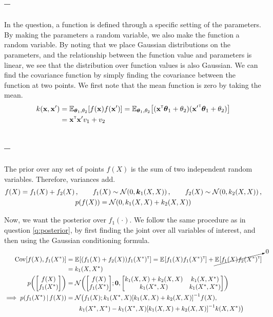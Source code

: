 \documentclass[a4paper]{article}
\newcommand{\mat}[1]{{\boldsymbol{{#1}}}} %
\newcommand{\questionref}[1]{\Cref{#1} -- \nameref{#1}}
\theoremstyle{definition}
\begin{document}
\subsection{\questionref{q:weights}}
In the question, a function is defined through a specific setting of the parameters. By making the parameters a random variable, we also make the function a random variable. By noting that we place Gaussian distributions on the parameters, and the relationship between the function value and parameters is linear, we see that the distribution over function values is also Gaussian. We can find the covariance function by simply finding the covariance between the function at two points. We first note that the mean function is zero by taking the mean.
\begin{align}
k(\vx, \vx') &= \Exp{\vtheta_1, \theta_2}{f(\vx) f(\vx')} = \Exp{\vtheta_1, \theta_2}{(\vx\transpose \vtheta_1 + \theta_2) ({\vx'}\transpose\vtheta_1 + \theta_2)} \\
&= \vx\transpose\vx' v_1 + v_2
\end{align}

\subsection{\questionref{q:gp-sum}}
The prior over any set of points $f(X)$ is the sum of two independent random variables. Therefore, variances add.
\begin{gather}
f(X) = f_1(X) + f_2(X)\,, \qquad  f_1(X) \sim \NormDist{0, \mat k_1(X, X)} \,, \qquad f_2(X)\sim\NormDist{0, k_2(X, X)} \,, \\
p(f(X)) = \NormDist{0, k_1(X, X) + k_2(X, X)}
\end{gather}

Now, we want the posterior over $f_1(\cdot)$. We follow the same procedure as in question \ref{q:posterior}, by first finding the joint over all variables of interest, and then using the Gaussian conditioning formula.
\begin{align}
\Cov[f(X), f_1(X^*)] &= \Exp{}{(f_1(X) + f_2(X))f_1(X^*)\transpose} = \Exp{}{f_1(X)f_1(X^*)\transpose} + \cancelto{0}{\Exp{}{f_1(X)f_2(X^*)\transpose}} \nonumber \\
&= k_1(X, X^*)\\
p\left(\begin{bmatrix} f(X) \\ f_1(X^*)\end{bmatrix}\right) &= \NormDist{\begin{bmatrix} f(X) \\ f_1(X^*)\end{bmatrix}; \mathbf 0,
\begin{bmatrix}
k_1(X, X) + k_2(X, X) & k_1(X, X^*) \\
k_1(X^*, X) & k_1(X^*, X^*)
\end{bmatrix}
} \\
\implies p(f_1(X^*) \given f(X)) &= \mathcal N\big(f_1(X); k_1(X^*, X)\left[k_1(X, X) + k_2(X, X)\right]\inv f(X), \nonumber \\
&\qquad k_1(X^*, X^*) -  k_1(X^*, X)\left[k_1(X, X) + k_2(X, X)\right]\inv k(X, X^*) \big)
\end{align}
\end{document}
